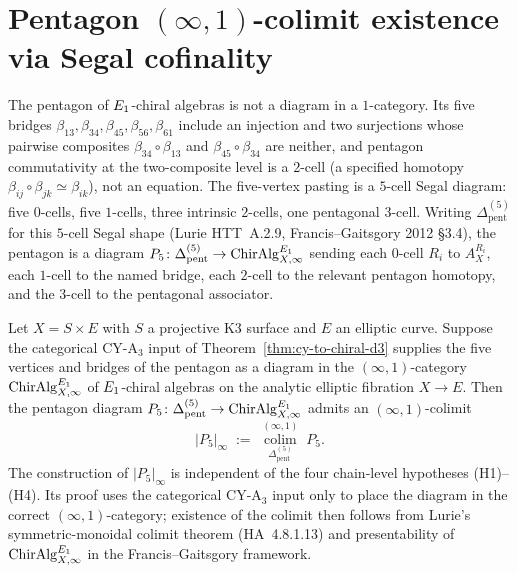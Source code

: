 \section{Pentagon \texorpdfstring{$(\infty,1)$}{(infty,1)}-colimit existence via Segal cofinality}
\label{sec:cyc-pentagon-infty1-existence}

The pentagon of $E_{1}$-chiral algebras is not a diagram in a $1$-category. Its five bridges
$\beta_{13}, \beta_{34}, \beta_{45}, \beta_{56}, \beta_{61}$ include an injection and two surjections
whose pairwise composites $\beta_{34} \circ \beta_{13}$ and $\beta_{45} \circ \beta_{34}$ are neither,
and pentagon commutativity at the two-composite level is a $2$-cell (a specified homotopy
$\beta_{ij} \circ \beta_{jk} \simeq \beta_{ik}$), not an equation. The five-vertex pasting is a
$5$-cell Segal diagram: five $0$-cells, five $1$-cells, three intrinsic $2$-cells, one pentagonal
$3$-cell. Writing $\Delta^{(5)}_{\mathrm{pent}}$ for this $5$-cell Segal shape
(Lurie HTT~A.2.9, Francis--Gaitsgory 2012 \S3.4), the pentagon is a diagram
$P_5 \colon \Delta^{(5)}_{\mathrm{pent}} \to \mathrm{ChirAlg}^{E_{1}}_{X,\infty}$ sending each
$0$-cell $R_i$ to $A_X^{R_i}$, each $1$-cell to the named bridge, each $2$-cell to the relevant
pentagon homotopy, and the $3$-cell to the pentagonal associator.

\begin{theorem}
\label{thm:pentagon-infty1-colimit-exists}
Let $X = S \times E$ with $S$ a projective K3 surface and $E$ an elliptic curve. Suppose the
categorical CY-A$_3$ input of Theorem~\ref{thm:cy-to-chiral-d3} supplies the five vertices and
bridges of the pentagon as a diagram in the
$(\infty,1)$-category $\mathrm{ChirAlg}^{E_{1}}_{X,\infty}$ of $E_{1}$-chiral algebras on the
analytic elliptic fibration $X \to E$. Then the pentagon diagram
$P_5 \colon \Delta^{(5)}_{\mathrm{pent}} \to \mathrm{ChirAlg}^{E_{1}}_{X,\infty}$ admits an
$(\infty,1)$-colimit
\[
 |P_5|_\infty \;:=\; \operatorname*{colim}_{\Delta^{(5)}_{\mathrm{pent}}}^{(\infty,1)} \; P_5.
\]
The construction of $|P_5|_\infty$ is independent of the four
chain-level hypotheses (H1)--(H4). Its proof uses the categorical
CY-A$_3$ input only to place the diagram in the correct
$(\infty,1)$-category; existence of the colimit then follows from
Lurie's symmetric-monoidal colimit theorem (HA~4.8.1.13) and
presentability of $\mathrm{ChirAlg}^{E_{1}}_{X,\infty}$ in the
Francis--Gaitsgory framework.
\end{theorem}


